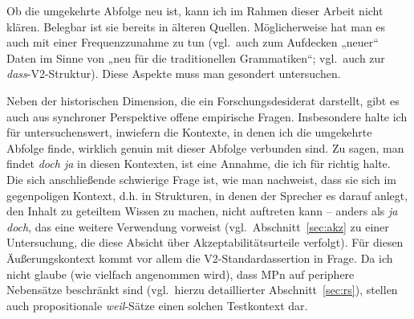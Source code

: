 Ob die umgekehrte Abfolge neu ist, kann ich im Rahmen dieser Arbeit nicht klären. Belegbar ist sie bereits in älteren Quellen. Möglicherweise hat man es auch mit einer Frequenzzunahme zu tun (vgl.\ auch \citealt[2]{Imo2010} zum Aufdecken „neuer“ Daten im Sinne von „neu für die traditionellen Grammatiken“; vgl.\ auch \citealt[279]{Freywald2008} zur \textit{dass}-V2-Struktur). Diese Aspekte muss man gesondert untersuchen. 

Neben der historischen Dimension, die ein Forschungsdesiderat darstellt, gibt es auch aus synchroner Perspektive offene empirische Fragen. Insbesondere halte ich für untersuchenswert, inwiefern die Kontexte, in denen ich die umgekehr\-te Abfolge finde, wirklich genuin mit dieser Abfolge verbunden sind. Zu sagen, man findet \textit{doch ja} in diesen Kontexten, ist eine Annahme, die ich für richtig halte. Die sich anschließende schwierige Frage ist, wie man nachweist, dass sie sich im gegenpoligen Kontext, d.h. in Strukturen, in denen der Sprecher es darauf anlegt, den Inhalt zu geteiltem Wissen zu machen, nicht auftreten kann – anders als \textit{ja doch}, das eine weitere Verwendung vorweist (vgl.\ Abschnitt~\ref{sec:akz} zu einer Untersuchung, die diese Absicht über Akzeptabilitätsurteile verfolgt). Für diesen Äußerungskontext kommt vor allem die V2-Standardassertion in Frage. Da ich nicht glaube (wie vielfach angenommen wird), dass MPn auf periphere Nebensätze beschränkt sind (vgl.\ hierzu detaillierter Abschnitt~\ref{sec:rs}), stellen auch propositionale \textit{weil}-Sätze einen solchen Testkontext dar.

